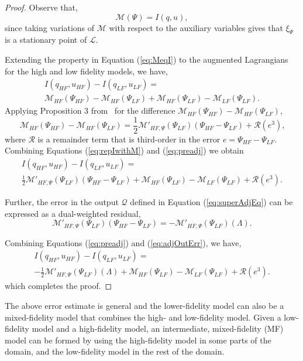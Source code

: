 %
\begin{proof}
%
Observe that,
%
\begin{equation}
\label{eq:MeqI}
\mathcal{M}(\Psi)=I(q,u),
\end{equation} 
%
since taking variations of $\mathcal{M}$ with respect to the auxiliary variables gives that $\xi_\Psi$ is a stationary point of $\mathcal{L}$.

Extending the property in Equation (\ref{eq:MeqI}) to the augmented Lagrangians for the high and low fidelity models, we have,
%
\begin{multline}
\label{eq:repIwithM}
I(q_{HF},u_{HF})-I(q_{LF},u_{LF})=\\\mathcal{M}_{HF}(\Psi_{HF})-\mathcal{M}_{HF}(\Psi_{LF})+\mathcal{M}_{HF}(\Psi_{LF})-\mathcal{M}_{LF}(\Psi_{LF})\textrm{.}
\end{multline}
%
Applying Proposition 3 from~\cite{BecVex05} for the difference $\mathcal{M}_{HF}(\Psi_{HF})-\mathcal{M}_{HF}(\Psi_{LF})$,  
\begin{equation}
\mathcal{M}_{HF}(\Psi_{HF})-\mathcal{M}_{HF}(\Psi_{LF}) = \frac{1}{2}\mathcal{M}'_{HF,\Psi}(\Psi_{LF})(\Psi_{HF}-\Psi_{LF})+\mathcal{R}(e^3)\textrm{,}
\end{equation}
where $\mathcal{R}$ is a remainder term that is third-order in the error $e=\Psi_{HF}-\Psi_{LF}$. Combining Equations (\ref{eq:repIwithM}) and (\ref{eq:preadj}) we obtain
\begin{multline}
\label{eq:preadj}
I(q_{HF},u_{HF})-I(q_{LF},u_{LF})=\\\frac{1}{2}\mathcal{M}'_{HF,\Psi}(\Psi_{LF})(\Psi_{HF}-\Psi_{LF})+\mathcal{M}_{HF}(\Psi_{LF})-\mathcal{M}_{LF}(\Psi_{LF})+\mathcal{R}(e^3)\textrm{.}
\end{multline}

Further, the error in the output $\mathcal{Q}$ defined in Equation (\ref{eq:superAdjEq}) can be expressed as a dual-weighted residual,
\begin{equation}
\label{eq:adjOutErr}
\mathcal M'_{HF,\Psi}(\Psi_{LF})(\Psi_{HF}-\Psi_{LF})=-\mathcal{M}'_{HF,\Psi}(\Psi_{LF})(\Lambda).
\end{equation}

Combining Equations (\ref{eq:preadj}) and (\ref{eq:adjOutErr}), we have,
\begin{multline}
I(q_{HF},u_{HF})-I(q_{LF},u_{LF})=\\-\frac{1}{2}\mathcal{M}'_{HF,\Psi}(\Psi_{LF})(\Lambda)+\mathcal M_{HF}(\Psi_{LF})-\mathcal M_{LF}(\Psi_{LF})+\mathcal{R}(e^3).
\end{multline}
%
which completes the proof.
\end{proof}
%
The above error estimate is general and the lower-fidelity model can also be a mixed-fidelity model that combines the high- and low-fidelity model. Given a low-fidelity model and a high-fidelity model, an intermediate, mixed-fidelity (MF) model can be formed by using the high-fidelity model in some parts of the domain, and the low-fidelity model in the rest of the domain.
